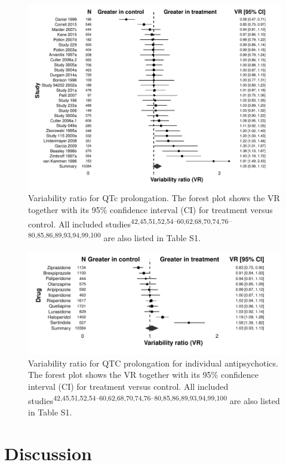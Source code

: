 \documentclass[9pt,english,,jou,floatsintext]{apa6}
\begin{document}
\begin{figure}
\centering
\includegraphics{../output/figures/qtcsd_fig1.pdf}
\caption{\label{fig:fig5}Variability ratio for QTc prolongation. The forest
plot shows the VR together with its 95\% confidence interval (CI) for
treatment versus control. All included
studies\textsuperscript{42,45,51,52,54--60,62,68,70,74,76--80,85,86,89,93,94,99,100}
are also listed in Table S1.}
\end{figure}

\begin{figure}
\centering
\includegraphics{../output/figures/qtcsd_fig2.pdf}
\caption{\label{fig:fig6}Variability ratio for QTC prolongation for
individual antipsychotics. The forest plot shows the VR together with
its 95\% confidence interval (CI) for treatment versus control. All
included
studies\textsuperscript{42,45,51,52,54--60,62,68,70,74,76--80,85,86,89,93,94,99,100}
are also listed in Table S1.}
\end{figure}

\section{Discussion}\label{discussion}
\end{document}
